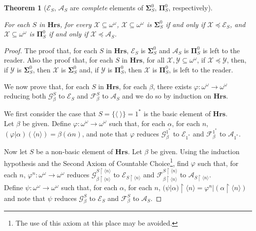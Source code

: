 \documentclass[a4paper]{amsart}
\theoremstyle{plain}
\newtheorem{theorem}{Theorem}
\begin{document}
\begin{theorem}[$\mathcal{E}_S$, $\mathcal{A}_S$ are \emph{complete} elements of $\mathbf{\Sigma}^0_S$, $\mathbf{\Pi}^0_S$, respectively]$\;$

For each  $S$ in $\mathbf{Hrs}$, for every $\mathcal{X}\subseteq \omega^\omega$,
$\mathcal{X}\subseteq \omega^\omega$ is $\mathbf{\Sigma}^0_S$ if and only if $\mathcal{X}\preceq \mathcal{E}_S$, and  $\mathcal{X}\subseteq \omega^\omega$ is $\mathbf{\Pi}^0_S$ if and only if $\mathcal{X}\preceq \mathcal{A}_S$. \end{theorem} 

\begin{proof} The proof that, for each $S$ in $\mathbf{Hrs}$, $\mathcal{E}_S$ is $\mathbf{\Sigma}^0_S$ and $\mathcal{A}_S$ is $\mathbf{\Pi}^0_S$ is left to the reader.
Also the proof that, for each $S$ in $\mathbf{Hrs}$, for  all $\mathcal{X}, \mathcal{Y}\subseteq \omega^\omega$, if $\mathcal{X}\preceq \mathcal{Y}$, then, if $\mathcal{Y}$ is $\mathbf{\Sigma}^0_S$, then  $\mathcal{X}$ is $\mathbf{\Sigma}^0_S$ and, if $\mathcal{Y}$ is $\mathbf{\Pi}^0_S$, then  $\mathcal{X}$ is $\mathbf{\Pi}^0_S$, is left to the reader.

\smallskip

 We now prove that, for each $S$ in $\mathbf{Hrs}$, for each $\beta$, there exists $\varphi:\omega^\omega\rightarrow \omega^\omega$ reducing both $\mathcal{G}^S_\beta$ to $\mathcal{E}_S$ and $\mathcal{F}^S_\beta$ to $\mathcal{A}_S$ and we do so by induction on $\mathbf{Hrs}$. 

\smallskip
We first consider the case that $S=\{\langle\;\rangle\}=1^\ast$ is the basic element of $\mathbf{Hrs}$.  \\Let $\beta$ be given. Define $\varphi:\omega^\omega\rightarrow\omega^\omega$ such that, for each $\alpha$, for each $n$, \\$(\varphi|\alpha)(\langle n\rangle)=\beta(\overline\alpha n)$, and note that $\varphi$ reduces $\mathcal{G}^{1^\ast}_\beta$ to $\mathcal{E}_{1^\ast}$ and $\mathcal{F}^{1^\ast}_\beta$ to $\mathcal{A}_{1^\ast}$.

\smallskip Now let $S$ be a non-basic element of $\mathbf{Hrs}$. Let $\beta$ be given. Using the induction hypothesis and the Second Axiom of Countable Choice\footnote{The use of this axiom at this place may be avoided.}, find $\varphi$ such that, for each $n$, $\varphi^n:\omega^\omega\rightarrow \omega^\omega$ reduces $\mathcal{G}^{S\upharpoonright\langle n \rangle}_{\beta\upharpoonright\langle n \rangle}$ to $\mathcal{E}_{S\upharpoonright \langle n \rangle}$ and $\mathcal{F}^{S\upharpoonright\langle n \rangle}_{\beta\upharpoonright\langle n \rangle}$ to $\mathcal{A}_{S\upharpoonright \langle n \rangle}$. \\Define $\psi:\omega^\omega\rightarrow\omega^\omega$ such that, for each $\alpha$, for each $n$, $(\psi|\alpha)\upharpoonright \langle n \rangle = \varphi^n|(\alpha\upharpoonright\langle n\rangle )$ and note that $\psi$ reduces $\mathcal{G}^S_\beta$ to $\mathcal{E}_S$ and $\mathcal{F}^S_\beta$ to $\mathcal{A}_S$. 
\end{proof}
\end{document}
